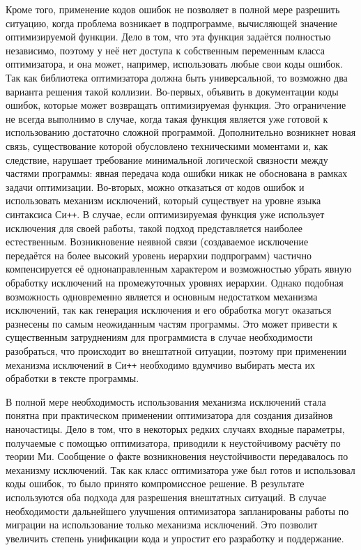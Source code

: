 Кроме того, применение кодов ошибок не позволяет в полной мере
разрешить ситуацию, когда проблема возникает в подпрограмме,
вычисляющей значение оптимизируемой функции. Дело в том, что эта
функция задаётся полностью независимо, поэтому у неё нет доступа к
собственным переменным класса оптимизатора, и она может, например,
использовать любые свои коды ошибок. Так как библиотека оптимизатора
должна быть универсальной, то возможно два варианта решения такой
коллизии. Во-первых, объявить в документации коды ошибок, которые
может возвращать оптимизируемая функция. Это ограничение не всегда
выполнимо в случае, когда такая функция является уже
готовой к использованию достаточно сложной программой. Дополнительно
возникнет новая связь, существование которой обусловлено техническими
моментами и, как следствие, нарушает требование минимальной логической
связности между частями программы: явная передача кода ошибки никак не
обоснована в рамках задачи оптимизации.  Во-вторых, можно отказаться
от кодов ошибок и использовать механизм исключений, который существует
на уровне языка синтаксиса Си\texttt{++}.  В случае, если
оптимизируемая функция уже использует исключения для своей работы,
такой подход представляется наиболее естественным.  Возникновение
неявной связи (создаваемое исключение передаётся на более высокий
уровень иерархии подпрограмм) частично компенсируется её
однонаправленным характером и возможностью убрать явную обработку
исключений на промежуточных уровнях иерархии.  Однако подобная
возможность одновременно является и основным недостатком механизма
исключений, так как генерация исключения и его обработка могут
оказаться разнесены по самым неожиданным частям программы.  Это может
привести к существенным затруднениям для программиста в случае
необходимости разобраться, что происходит во внештатной ситуации,
поэтому при применении механизма исключений в Си\texttt{++} необходимо
вдумчиво выбирать места их обработки в тексте программы.

В полной мере необходимость использования механизма исключений стала
понятна при практическом применении оптимизатора для создания дизайнов
наночастицы.  Дело в том, что в некоторых редких случаях входные
параметры, получаемые с помощью оптимизатора, приводили к
неустойчивому расчёту по теории Ми. Сообщение о факте возникновения
неустойчивости передавалось по механизму исключений. Так как класс
оптимизатора уже был готов и использовал коды ошибок, то было принято
компромиссное решение. В результате используются
оба подхода для разрешения внештатных ситуаций. В случае
необходимости дальнейшего улучшения оптимизатора запланированы работы
по миграции на использование только механизма исключений. Это позволит
увеличить степень унификации кода и упростит его разработку и
поддержание.


